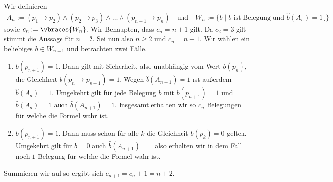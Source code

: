 \begin{solution}
	Wir definieren 
	\begin{align*}
	A_n := (p_1 \to p_2) \land (p_2 \to p_3) \land \dots \land (p_{n-1} \to p_n) \quad \text{und} \quad W_n := \{b \mid b \text{ ist Belegung und } \hat{b}(A_n) = 1¸\}
	\end{align*}
	sowie $c_n := \vbraces{W_n}$. Wir Behaupten, dass $c_n = n + 1$ gilt. Da $c_2 = 3$ gilt stimmt die Aussage für $n = 2$. Sei nun also $n \geq 2$ und $c_n = n + 1$. Wir wählen ein beliebiges $b \in W_{n + 1}$ und betrachten zwei Fälle.
	\begin{enumerate}[label = Fall \arabic*:]
		\item $b(p_{n + 1}) = 1$. Dann gilt mit Sicherheit, also unabhängig vom Wert $b(p_n)$, die Gleichheit $b(p_n \rightarrow p_{n+1}) = 1$. Wegen $\hat{b}(A_{n+1}) = 1$ ist außerdem $\hat{b}(A_{n}) = 1$. Umgekehrt gilt für jede Belegung $b$ mit $b(p_{n+1}) = 1$ und $\hat{b}(A_n) = 1$ auch $\hat{b}(A_{n+1}) = 1$. Insgesamt erhalten wir so $c_n$ Belegungen für welche die Formel wahr ist.
		\item $b(p_{n + 1}) = 1$. Dann muss schon für alle $k$ die Gleichheit $b(p_k) = 0$ gelten. Umgekehrt gilt für $b = 0$ auch $\hat{b}(A_{n + 1}) = 1$ also erhalten wir in dem Fall noch $1$ Belegung für welche die Formel wahr ist. 
	\end{enumerate}
	Summieren wir auf so ergibt sich $c_{n + 1} = c_n + 1 = n + 2$.
\end{solution}

